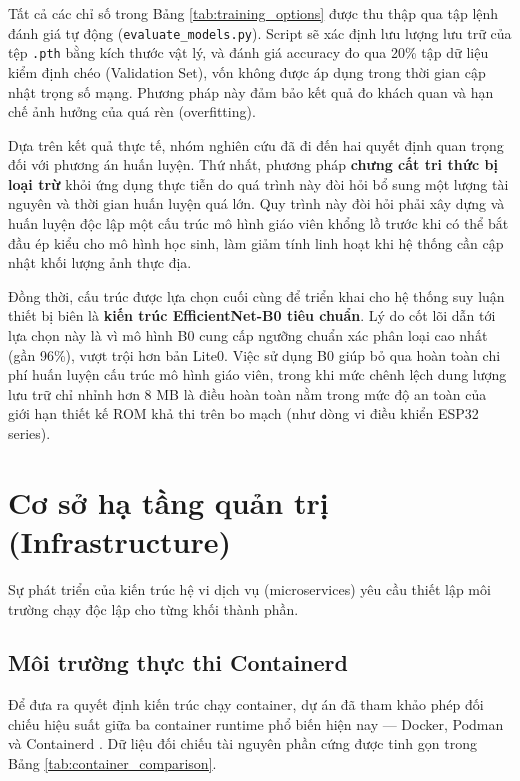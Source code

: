 \documentclass[12pt,a4paper]{report}
\begin{document}
Tất cả các chỉ số trong Bảng \ref{tab:training_options} được thu thập qua tập lệnh đánh giá tự động (\texttt{evaluate\_models.py}). Script sẽ xác định lưu lượng lưu trữ của tệp \texttt{.pth} bằng kích thước vật lý, và đánh giá accuracy đo qua 20\% tập dữ liệu kiểm định chéo (Validation Set), vốn không được áp dụng trong thời gian cập nhật trọng số mạng. Phương pháp này đảm bảo kết quả đo khách quan và hạn chế ảnh hưởng của quá rèn (overfitting).

Dựa trên kết quả thực tế, nhóm nghiên cứu đã đi đến hai quyết định quan trọng đối với phương án huấn luyện. Thứ nhất, phương pháp \textbf{chưng cất tri thức bị loại trừ} khỏi ứng dụng thực tiễn do quá trình này đòi hỏi bổ sung một lượng tài nguyên và thời gian huấn luyện quá lớn. Quy trình này đòi hỏi phải xây dựng và huấn luyện độc lập một cấu trúc mô hình giáo viên khổng lồ trước khi có thể bắt đầu ép kiểu cho mô hình học sinh, làm giảm tính linh hoạt khi hệ thống cần cập nhật khối lượng ảnh thực địa.

Đồng thời, cấu trúc được lựa chọn cuối cùng để triển khai cho hệ thống suy luận thiết bị biên là \textbf{kiến trúc EfficientNet-B0 tiêu chuẩn}. Lý do cốt lõi dẫn tới lựa chọn này là vì mô hình B0 cung cấp ngưỡng chuẩn xác phân loại cao nhất (gần 96\%), vượt trội hơn bản Lite0. Việc sử dụng B0 giúp bỏ qua hoàn toàn chi phí huấn luyện cấu trúc mô hình giáo viên, trong khi mức chênh lệch dung lượng lưu trữ chỉ nhỉnh hơn 8 MB là điều hoàn toàn nằm trong mức độ an toàn của giới hạn thiết kế ROM khả thi trên bo mạch (như dòng vi điều khiển ESP32 series).

\section{Cơ sở hạ tầng quản trị (Infrastructure)}

Sự phát triển của kiến trúc hệ vi dịch vụ (microservices) yêu cầu thiết lập môi trường chạy độc lập cho từng khối thành phần.

\subsection{Môi trường thực thi Containerd}

Để đưa ra quyết định kiến trúc chạy container, dự án đã tham khảo phép đối chiếu hiệu suất giữa ba container runtime phổ biến hiện nay — Docker, Podman và Containerd \cite{containerd_podman_docker_bench}. Dữ liệu đối chiếu tài nguyên phần cứng được tinh gọn trong Bảng \ref{tab:container_comparison}.
\end{document}
